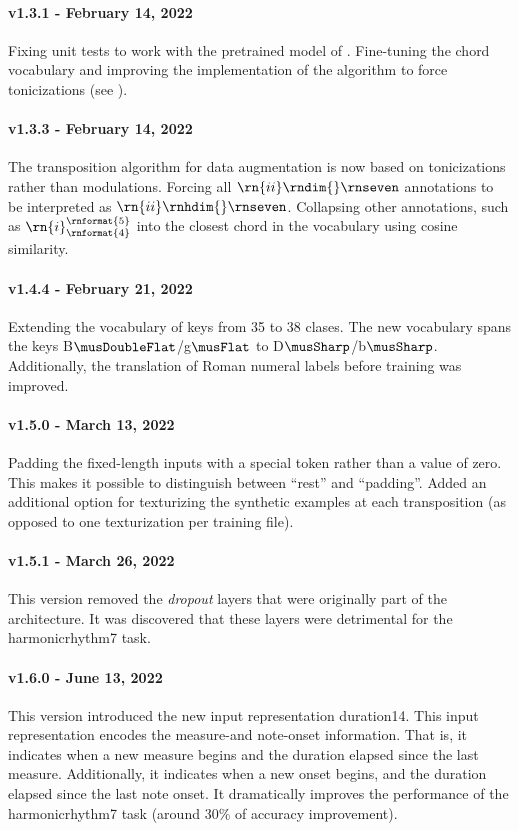 \paragraph{v1.3.1 - February 14, 2022}
Fixing unit tests to work with the pretrained model of
. Fine-tuning the chord vocabulary and
improving the implementation of the algorithm to force
tonicizations (see ).

\paragraph{v1.3.3 - February 14, 2022}
The transposition algorithm for data augmentation is now
based on tonicizations rather than modulations. Forcing all
$\rn{ii}\rndim{}\rnseven$ annotations to be interpreted as
$\rn{ii}\rnhdim{}\rnseven$. Collapsing other annotations,
such as $\rn{i}^{\rnformat{5}}_{\rnformat{4}}$ into the
closest chord in the vocabulary using cosine similarity.

\paragraph{v1.4.4 - February 21, 2022}
Extending the vocabulary of keys from 35 to 38 clases. The
new vocabulary spans the keys B$\musDoubleFlat$/g$\musFlat$
to D$\musSharp$/b$\musSharp$. Additionally, the translation
of Roman numeral labels before training was improved.

\paragraph{v1.5.0 - March 13, 2022}
Padding the fixed-length inputs with a special token rather
than a value of zero. This makes it possible to distinguish
between ``rest'' and ``padding''. Added an additional option
for texturizing the synthetic examples at each transposition
(as opposed to one texturization per training file).

\paragraph{v1.5.1 - March 26, 2022}
This version removed the \emph{dropout} layers
\parencite{dahl2013improving} that were originally part of
the architecture. It was discovered that these layers were
detrimental for the \gls{harmonicrhythm7} task.

\paragraph{v1.6.0 - June 13, 2022}
This version introduced the new input representation
\gls{duration14}. This input representation encodes the
measure-and note-onset information. That is, it indicates
when a new measure begins and the duration elapsed since the
last measure. Additionally, it indicates when a new onset
begins, and the duration elapsed since the last note onset.
It dramatically improves the performance of the
\gls{harmonicrhythm7} task (around 30\% of accuracy
improvement).

